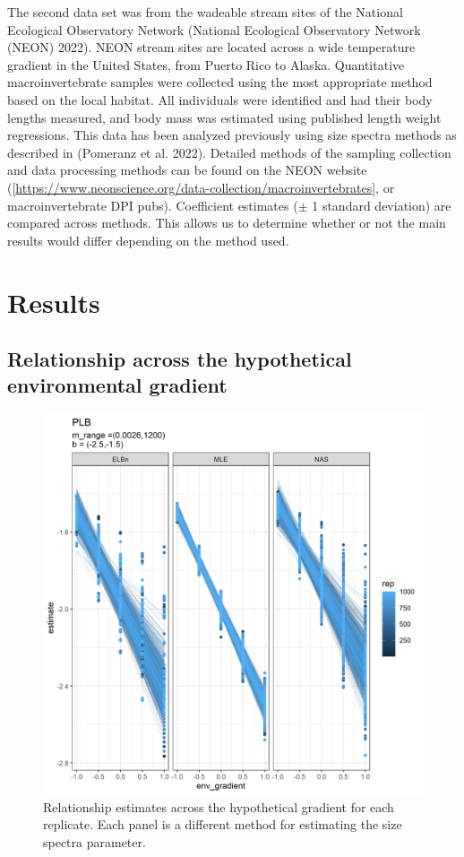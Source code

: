 \documentclass[
]{article}
\begin{document}
The second data set was from the wadeable stream sites of the National
Ecological Observatory Network (National Ecological Observatory Network
(NEON) 2022). NEON stream sites are located across a wide temperature
gradient in the United States, from Puerto Rico to Alaska. Quantitative
macroinvertebrate samples were collected using the most appropriate
method based on the local habitat. All individuals were identified and
had their body lengths measured, and body mass was estimated using
published length weight regressions. This data has been analyzed
previously using size spectra methods as described in (Pomeranz et al.
2022). Detailed methods of the sampling collection and data processing
methods can be found on the NEON website
({[}\url{https://www.neonscience.org/data-collection/macroinvertebrates}{]},
or macroinvertebrate DPI pubs). Coefficient estimates (\(\pm\) 1
standard deviation) are compared across methods. This allows us to
determine whether or not the main results would differ depending on the
method used.

\hypertarget{results}{%
\section{Results}\label{results}}

\hypertarget{relationship-across-the-hypothetical-environmental-gradient}{%
\subsection{Relationship across the hypothetical environmental
gradient}\label{relationship-across-the-hypothetical-environmental-gradient}}

\begin{figure}
\centering
\includegraphics{figures/PLB_sim_main.png}
\caption{Relationship estimates across the hypothetical gradient for
each replicate. Each panel is a different method for estimating the size
spectra parameter.}
\end{figure}
\end{document}
